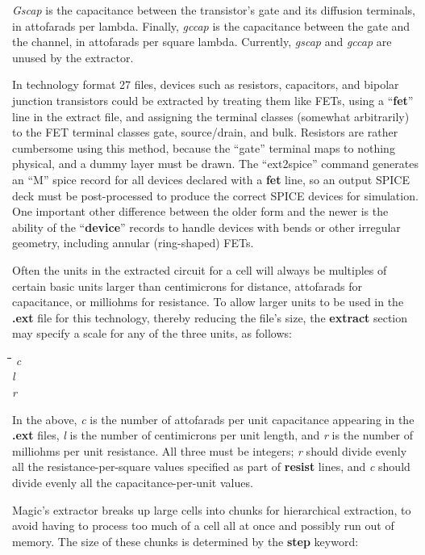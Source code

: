 \documentclass[letterpaper,twoside,12pt]{article}
\def\hinch{\hspace*{0.5in}}
\def\starti{\begin{center}\begin{tabbing}\hinch\=\hinch\=\hinch\=\hinch\=\kill}
\def\endi{\end{tabbing}\end{center}}
\def\ii{\>\>\>}
\begin{document}
{\itshape Gscap} is the capacitance between the transistor's gate
and its diffusion terminals, in attofarads per lambda.
Finally, {\itshape gccap} is the capacitance between the gate
and the channel, in attofarads per square lambda.
Currently, {\itshape gscap} and {\itshape gccap} are unused by the extractor.

In technology format 27 files, devices such as resistors, capacitors,
and bipolar junction transistors could be extracted by treating them
like FETs, using a ``{\bfseries fet}'' line in the extract file, and
assigning the terminal classes (somewhat arbitrarily) to the FET
terminal classes gate, source/drain, and bulk.  Resistors are rather
cumbersome using this method, because the ``gate'' terminal maps to
nothing physical, and a dummy layer must be drawn.  The ``ext2spice''
command generates an ``M'' spice record for all devices declared with
a {\bfseries fet} line, so an output SPICE deck must be post-processed
to produce the correct SPICE devices for simulation.  One important
other difference between the older form and the newer is the ability
of the ``{\bfseries device}'' records to handle devices with bends or
other irregular geometry, including annular (ring-shaped) FETs.

Often the units in the extracted circuit for a cell will always
be multiples of certain basic units larger than centimicrons
for distance, attofarads for capacitance, or milliohms for resistance.
To allow larger units to be used in the {\bfseries .ext} file for this
technology, thereby reducing the file's size,
the {\bfseries extract} section may specify a scale
for any of the three units, as follows:

\starti
   \ii {\bfseries cscale} {\itshape c} \\
   \ii {\bfseries lambda} {\itshape l} \\
   \ii {\bfseries rscale} {\itshape r}
\endi

In the above, {\itshape c} is the number of attofarads per unit capacitance
appearing in the {\bfseries .ext} files, {\itshape l} is the number of centimicrons
per unit length, and {\itshape r} is the number of milliohms per unit
resistance.  All three must be integers;
{\itshape r} should divide evenly all the resistance-per-square values
specified as part of {\bfseries resist} lines,
and {\itshape c} should divide evenly all the capacitance-per-unit values.

Magic's extractor breaks up large cells into chunks
for hierarchical extraction, to avoid having to process too
much of a cell all at once and possibly run out of memory.
The size of these chunks is determined by the {\bfseries step}
keyword:
\end{document}

